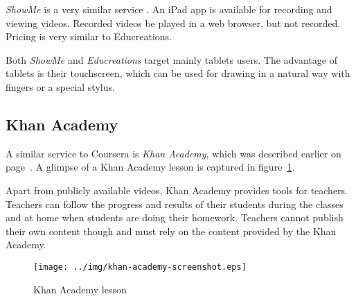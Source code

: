 \textit{ShowMe} is a very similar service \cite{showme}. An iPad app is available for recording and viewing videos. Recorded videos be played in a web browser, but not recorded. Pricing is very similar to Educreations.

Both \textit{ShowMe} and \textit{Educreations} target mainly tablets users. The advantage of tablets is their touchscreen, which can be used for drawing in a natural way with fingers or a special stylus.



\subsection{Khan Academy}
A similar service to Coursera is \textit{Khan Academy}, which was described earlier on page~\pageref{sec:khan-academy}. A glimpse of a Khan Academy lesson is captured in figure~\ref{fig:khan-screen}.

Apart from publicly available videos, Khan Academy provides tools for teachers. Teachers can follow the progress and results of their students during the classes and at home when students are doing their homework. Teachers cannot publish their own content though and must rely on the content provided by the Khan Academy.

\begin{figure}
	\centering
		\texttt{[image: ../img/khan-academy-screenshot.eps]}
		\caption{Khan Academy lesson}
		\label{fig:khan-screen}
\end{figure}